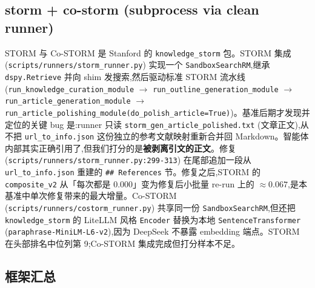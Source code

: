 \documentclass[UTF8,a4paper,12pt,oneside]{ctexart}
\begin{document}
\subsection{storm + co-storm (subprocess via clean runner)}

STORM 与 Co-STORM 是 Stanford 的 \texttt{knowledge\_storm} 包。STORM 集成 (\texttt{scripts/runners/storm\_runner.py}) 实现一个 \texttt{SandboxSearchRM},继承 \texttt{dspy.Retrieve} 并向 shim 发搜索,然后驱动标准 STORM 流水线 (\texttt{run\_knowledge\_curation\_module} \(\to\) \texttt{run\_outline\_generation\_module} \(\to\) \texttt{run\_article\_generation\_module} \(\to\) \texttt{run\_article\_polishing\_module(do\_polish\_article=True)})。基准后期才发现并定位的关键 bug 是:runner 只读 \texttt{storm\_gen\_article\_polished.txt} (文章正文),从不把 \texttt{url\_to\_info.json} 这份独立的参考文献映射重新合并回 Markdown。智能体内部其实正确引用了,但我们打分的是\textbf{被剥离引文的正文}。修复 (\texttt{scripts/runners/storm\_runner.py:299-313}) 在尾部追加一段从 \texttt{url\_to\_info.json} 重建的 \texttt{\#\# References} 节。修复之后,STORM 的 \texttt{composite\_v2} 从「每次都是 0.000」变为修复后小批量 re-run 上的 \(\approx 0.067\),是本基准中单次修复带来的最大增量。Co-STORM (\texttt{scripts/runners/costorm\_runner.py}) 共享同一份 \texttt{SandboxSearchRM},但还把 \texttt{knowledge\_storm} 的 LiteLLM 风格 \texttt{Encoder} 替换为本地 \texttt{SentenceTransformer} (\texttt{paraphrase-MiniLM-L6-v2}),因为 DeepSeek 不暴露 embedding 端点。STORM 在头部排名中位列第 9;Co-STORM 集成完成但打分样本不足。

\subsection{框架汇总}
\end{document}
